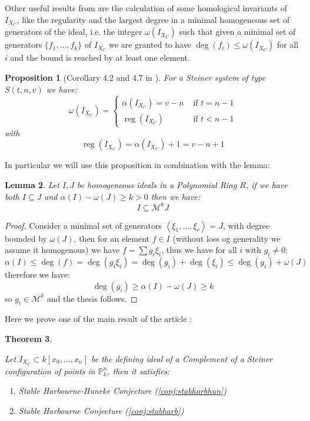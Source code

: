 \documentclass[a4wide]{book}
\theoremstyle{plain}
\newtheorem{teo}{Theorem}[section]
\newtheorem{lem}[teo]{Lemma}
\newtheorem{prop}[teo]{Proposition}
\theoremstyle{remark}
\theoremstyle{definition}
\newcommand{\PP}{\mathbb{P}}
\newcommand{\MM}{\mathcal{M}}
\DeclareMathOperator{\reg}{reg}
\begin{document}
Other useful results from \cite{Bal20Steiner} are the calculation of some homological invariants of $ I_{X_C}$, like the regularity and the largest degree in a minimal homogeneous set of generators of the ideal, i.e. the integer $ \omega (I_{X_	C}) $ such that given a minimal set of generators $\{ f_1 ,... , f_k\} $ of $ I_{X_	C} $ we are granted to have $ \deg (f_i) \leq \omega (I_{X_	C}) $ for all $ i $ and the bound is reached by at least one element. %

\begin{prop}[Corollary 4.2 and 4.7 in \cite{Bal20Steiner}]
\label{prop:largdeg}
For a Steiner system of type $ S(t,n,v) $ we have:
\begin{equation}\label{eq:largdeg}
\omega (I_{X_	C}) = 
\begin{cases}
\alpha (I_{X_	C})=v-n     & \text{ if } t = n-1\\
\reg(I_{X_C}) & \text{ if } t < n-1
\end{cases}
\end{equation}
with  \begin{equation}\label{eq:reqXC}
\reg(I_{X_C}) =\alpha (I_{X_	C})+1= v-n +1
\end{equation}
\end{prop}

In particular we will use this proposition in combination with the lemma:
\begin{lem}\label{lem:cont_om}
Let $ I,J $ be homogeneous ideals in a Polynomial Ring $ R $, if we have both $ I \subseteq J $ and $ \alpha(I) - \omega (J) \geq k >0 $ then we have:
\[ I \subseteq \MM^k J\]
\end{lem}
\begin{proof}
Consider a minimal set of generators $ \left\langle \xi_1 , ... ,\xi_r \right\rangle = J $, with degree bounded by $ \omega(J) $, then for an element $ f \in I $ (without loss og generality we assume it homogenous) we have $ f = \sum g_i \xi_i  $, thus we have for all $ i $ with $ g_i\neq 0 $:
\[ \alpha(I) \leq \deg (f) = \deg(g_i \xi_i ) = \deg(g_i) + \deg(\xi_i) \leq  \deg(g_i) + \omega(J) \]
therefore we have:
\[ \deg(g_i)  \geq\alpha(I) - \omega (J) \geq k \]
so $ g_i \in \MM^k $ and the thesis follows.
\end{proof}


Here we prove one of the main result of the article \cite{Bal21Steiner}:
\begin{teo}\label{teo:cont:csteiner}

Let $ I_{X_C} \subset k[x_0 , ... , x_n]$ be the defining ideal of a Complement of a Steiner configuration of points in $ \PP^n_k $, then it satisfies:
\begin{enumerate}
\item Stable Harbourne-Huneke Conjecture (\ref{conj:stabharbhun})
\item Stable Harbourne Conjecture (\ref{conj:stabharb})
\end{enumerate}
\end{teo}
\end{document}
